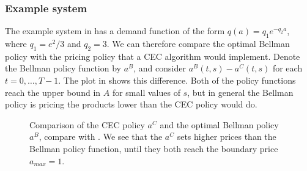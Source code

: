 \documentclass[main.tex]{subfiles}
\begin{document}
\subsubsection{Example system}
The example system in  has a demand
function of the form $q(a)=q_1e^{-q_2a}$, where $q_1=e^2/3$ and
$q_2=3$. We can therefore compare the optimal Bellman policy with the
pricing policy that a CEC algorithm would implement.
Denote the Bellman policy function by $a^B$, and consider
$a^B(t,s)-a^C(t,s)$ for each $t=0,\dots,T-1$. The plot in
 shows this difference.
Both of the policy functions reach the upper bound in $A$ for small values
of $s$, but in general the Bellman policy is pricing the products
lower than the CEC policy would do.
\begin{figure}[htbp]
  \centering
  \caption{Comparison of the CEC policy $a^C$ and
    the optimal Bellman policy $a^B$, compare with
    .
    We see that the $a^C$ sets
    higher prices than the Bellman policy function, until they both reach the
    boundary price $a_{max}=1$.
  }\label{fig:bellman_det_policy_difference}
\end{figure}
\end{document}
